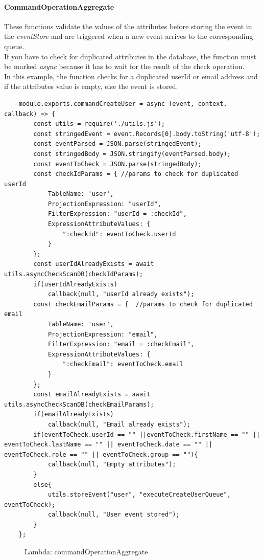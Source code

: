 \paragraph{CommandOperationAggregate} \Spazio
These functions validate the values of the attributes before storing the event in the \emph{eventStore} and are triggered when a new event arrives to the corresponding queue. \\ 
If you have to check for duplicated attributes in the database, the function must be marked \emph{async} because it has to wait for the result of the check operation.\\
In this example, the function checks for a duplicated userId or email address and if the attributes value is empty, else the event is stored.
\begin{lstlisting}
	module.exports.commandCreateUser = async (event, context, callback) => {
		const utils = require('./utils.js');
		const stringedEvent = event.Records[0].body.toString('utf-8'); 
		const eventParsed = JSON.parse(stringedEvent);
		const stringedBody = JSON.stringify(eventParsed.body);
		const eventToCheck = JSON.parse(stringedBody);
		const checkIdParams = { //params to check for duplicated userId
			TableName: 'user',
			ProjectionExpression: "userId",
			FilterExpression: "userId = :checkId",
			ExpressionAttributeValues: {
				":checkId": eventToCheck.userId
			}
		};
		const userIdAlreadyExists = await utils.asyncCheckScanDB(checkIdParams); 
		if(userIdAlreadyExists)
			callback(null, "userId already exists");
		const checkEmailParams = {  //params to check for duplicated email
			TableName: 'user',
			ProjectionExpression: "email",
			FilterExpression: "email = :checkEmail",
			ExpressionAttributeValues: {
				":checkEmail": eventToCheck.email
			}
		};
		const emailAlreadyExists = await utils.asyncCheckScanDB(checkEmailParams);
		if(emailAlreadyExists)
			callback(null, "Email already exists");
		if(eventToCheck.userId == "" ||eventToCheck.firstName == "" || eventToCheck.lastName == "" || eventToCheck.date == "" || eventToCheck.role == "" || eventToCheck.group == ""){ 
			callback(null, "Empty attributes");
		}
		else{
			utils.storeEvent("user", "executeCreateUserQueue", eventToCheck);
			callback(null, "User event stored");
		}
	};
\end{lstlisting}
\begin{figure}[H]
	\caption{Lambda: commandOperationAggregate}
\end{figure}

